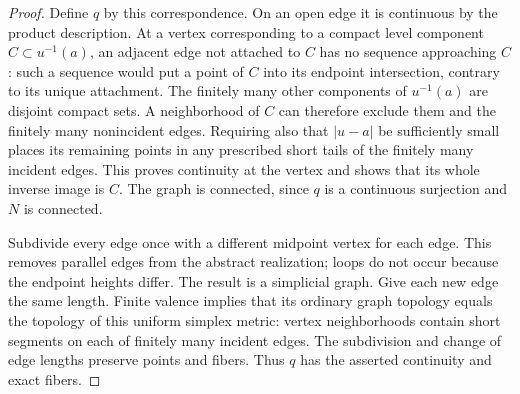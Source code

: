 \begin{proof}
Define $q$ by this correspondence.  On an open edge it is continuous
by the product description.  At a vertex corresponding to a compact
level component $C\subset u^{-1}(a)$, an adjacent edge not attached
to $C$ has no sequence approaching $C$: such a sequence would put
a point of $C$ into its endpoint intersection, contrary to its unique
attachment.  The finitely many other components of $u^{-1}(a)$ are
disjoint compact sets.  A neighborhood of $C$ can therefore exclude
them and the finitely many nonincident edges.  Requiring also that
$|u-a|$ be sufficiently small places its remaining points in any
prescribed short tails of the finitely many incident edges.  This
proves continuity at the vertex and shows that its whole inverse
image is $C$. The graph is connected, since $q$ is a continuous
surjection and $N$ is connected.

Subdivide every edge once with a different midpoint vertex for each
edge.  This removes parallel edges from the abstract realization;
loops do not occur because the endpoint heights differ.  The result
is a simplicial graph.  Give each new edge the same length.  Finite
valence implies that its ordinary graph topology equals the topology
of this uniform simplex metric: vertex neighborhoods contain short
segments on each of finitely many incident edges.  The subdivision
and change of edge lengths preserve points and fibers.  Thus $q$
has the asserted continuity and exact fibers.
\end{proof}

